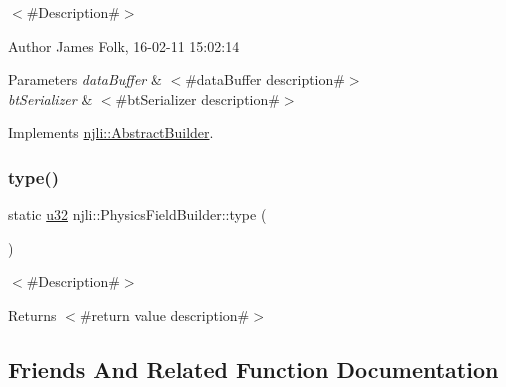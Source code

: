 $<$\#\+Description\#$>$ 

\begin{DoxyAuthor}{Author}
James Folk, 16-\/02-\/11 15\+:02\+:14
\end{DoxyAuthor}

\begin{DoxyParams}{Parameters}
{\em data\+Buffer} & $<$\#data\+Buffer description\#$>$ \\
\hline
{\em bt\+Serializer} & $<$\#bt\+Serializer description\#$>$ \\
\hline
\end{DoxyParams}


Implements \mbox{\hyperlink{classnjli_1_1_abstract_builder_ab66b774e02ccb9da554c9aab7fa6d981}{njli\+::\+Abstract\+Builder}}.

\mbox{\label{classnjli_1_1_physics_field_builder_a3f8f63a0e33bd854d2277ace452804cd}} 
\subsubsection{\texorpdfstring{type()}{type()}}
{\footnotesize\ttfamily static \mbox{\hyperlink{_util_8h_a10e94b422ef0c20dcdec20d31a1f5049}{u32}} njli\+::\+Physics\+Field\+Builder\+::type (\begin{DoxyParamCaption}{ }\end{DoxyParamCaption})\hspace{0.3cm}{\ttfamily [static]}}

$<$\#\+Description\#$>$

\begin{DoxyReturn}{Returns}
$<$\#return value description\#$>$ 
\end{DoxyReturn}


\subsection{Friends And Related Function Documentation}
\mbox{\label{classnjli_1_1_physics_field_builder_acb96ebb09abe8f2a37a915a842babfac}} 

